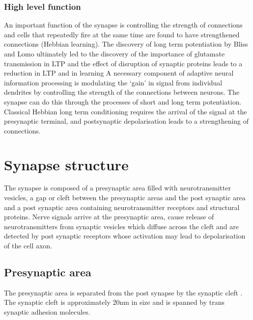 \subsubsection{High level function}

An important function of the synapse is controlling the strength of connections and cells that repeatedly fire at the same time are found to have strengthened connections (Hebbian learning)\cite{hebb1949organization_check}. The discovery of long term potentiation by Bliss and Lomo \cite{bliss1973long} ultimately led to the discovery of the importance of glutamate transmission in LTP and the effect of disruption of synaptic proteins leads to a reduction in LTP and in learning
A necessary component of adaptive neural information processing is modulating the ‘gain’ in signal from individual dendrites by controlling the strength of the connections between neurons. The synapse can do this through the processes of short and long term potentiation. Classical Hebbian \cite{hebb1949organization_check} long term conditioning requires the arrival of the signal at the presynaptic terminal, and postsynaptic depolarisation leads to a strengthening of connections.  

\section{Synapse structure}
The synapse is composed of a presynaptic area filled with neurotransmitter vesicles, a gap or cleft between the presynaptic areas and the post synaptic area and a post synaptic area containing neurotransmitter receptors and structural proteins. Nerve signals arrive at the presynaptic area, cause release of neurotransmitters from synaptic vesicles which diffuse across the cleft and are detected by post synaptic receptors whose activation may lead to depolarisation of the cell axon. 


\subsection{Presynaptic area}
The presynaptic area is separated from the post synapse by the synaptic cleft \cite{rusakov2011shaping}.  The synaptic cleft is approximately 20nm in size \cite{zuber2005mammalian} and is spanned by trans synaptic adhesion molecules.  \cite{missler2012synaptic}


